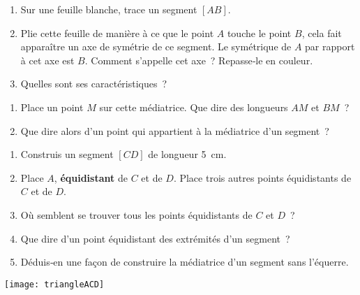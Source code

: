 \begin{activite}

 \begin{partie}
 
 \begin{enumerate}
  \item Sur une feuille blanche, trace un segment $[AB]$.
  \item Plie cette feuille de manière à ce que le point $A$ touche le point $B$, cela fait apparaître un axe de symétrie de ce segment. Le symétrique de $A$ par rapport à cet axe est $B$. Comment s'appelle cet axe ? Repasse‑le en couleur.
  \item Quelles sont ses caractéristiques ?
  \end{enumerate}
  
  \end{partie}
  
 \begin{partie}
 
 \begin{enumerate}
  \item Place un point $M$ sur cette médiatrice. Que dire des longueurs $AM$ et $BM$ ?
  \item Que dire alors d'un point qui appartient à la médiatrice d'un segment ?
  \end{enumerate}
  
  \end{partie}
  
 \begin{partie}
 
 \begin{minipage}[c]{0.86\linewidth}
 \begin {enumerate}
  \item Construis un segment $[CD]$ de longueur 5 cm. 
  \item Place $A$, \textbf{équidistant} de $C$ et de $D$. Place trois autres points équidistants de $C$ et de $D$. 
  \item Où semblent se trouver tous les points équidistants de $C$ et $D$ ?
  \item Que dire d'un point équidistant des extrémités d'un segment ?
  \item Déduis‑en une façon de construire la médiatrice d'un segment sans l'équerre. 
  \end{enumerate} 
  \end{minipage} \hfill %
 \begin{minipage}[c]{0.1\linewidth}
 \texttt{[image: triangleACD]}
  \end{minipage} \\
  
 \end{partie}

\end{activite}

